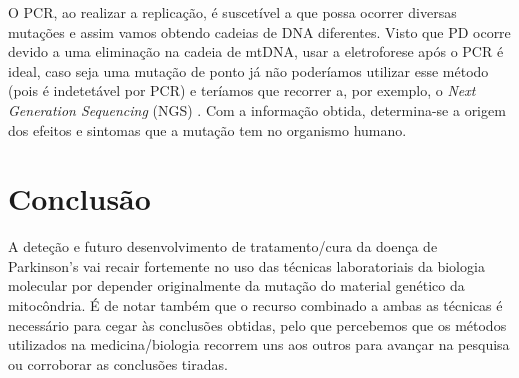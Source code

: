 \documentclass{article}
\begin{document}
    O PCR, ao realizar a replicação, é suscetível a que possa ocorrer diversas mutações e assim vamos obtendo cadeias de DNA diferentes.
    Visto que PD ocorre devido a uma eliminação na cadeia de mtDNA, usar a eletroforese após o PCR é ideal, caso seja uma mutação de ponto já não poderíamos utilizar esse método (pois é indetetável por PCR) e teríamos que recorrer a, por exemplo, o 
    \textit{Next Generation Sequencing} (NGS) \cite{Naini:2020aa}. Com a informação obtida, determina-se a origem dos efeitos e sintomas que a mutação tem no organismo humano.
    \section{Conclusão}
    A deteção e futuro desenvolvimento de tratamento/cura da doença de Parkinson's vai recair fortemente no uso das técnicas laboratoriais da biologia molecular por depender originalmente da mutação do material genético da mitocôndria. É de notar também que o recurso combinado a ambas as técnicas é necessário para cegar às conclusões obtidas, pelo que percebemos que os métodos utilizados na medicina/biologia recorrem uns aos outros para avançar na pesquisa ou corroborar as conclusões tiradas.

\newpage

% 

% 

\end{document}
